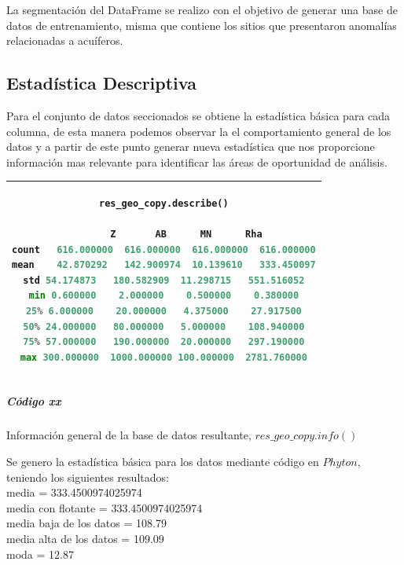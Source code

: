 \documentclass[sn-mathphys,Numbered]{sn-jnl}%
\theoremstyle{thmstyleone}%
\theoremstyle{thmstyletwo}%
\theoremstyle{thmstylethree}%
\begin{document}
La segmentación del DataFrame se realizo con el objetivo de generar una base de datos de entrenamiento, misma que contiene los sitios que presentaron anomalías relacionadas a acuíferos.


\subsection{Estadística Descriptiva}\label{subsec4}

Para el conjunto de datos seccionados se obtiene la estadística básica para cada columna, de esta manera podemos observar la el comportamiento general de los datos y a partir de este punto generar nueva estadística que nos proporcione información mas relevante para identificar las áreas de oportunidad de análisis.

\begin{center}
	\begin{tabular}{|c|}
		\hline
{\small \begin{lstlisting}[language=python]
res_geo_copy.describe()

		Z		AB		MN		Rha
count	616.000000	616.000000	616.000000	616.000000
mean	42.870292	142.900974	10.139610	333.450097
std	54.174873	180.582909	11.298715	551.516052
min	0.600000	2.000000	0.500000	0.380000
25%	6.000000	20.000000	4.375000	27.917500
50%	24.000000	80.000000	5.000000	108.940000
75%	57.000000	190.000000	20.000000	297.190000
max	300.000000	1000.000000	100.000000	2781.760000
\end{lstlisting}}\\
	\hline
\end{tabular}
\subparagraph*{Código xx}{\footnotesize Información general de la base de datos resultante, $res\_geo\_copy.info()$}\\
\end{center}

Se genero la estadística básica para los datos mediante código en $Phyton$, teniendo los siguientes resultados:\\

media = 333.4500974025974\\

media con flotante = 333.4500974025974\\

media baja de los datos = 108.79\\

media alta de los datos = 109.09\\

moda = 12.87\\
\end{document}
